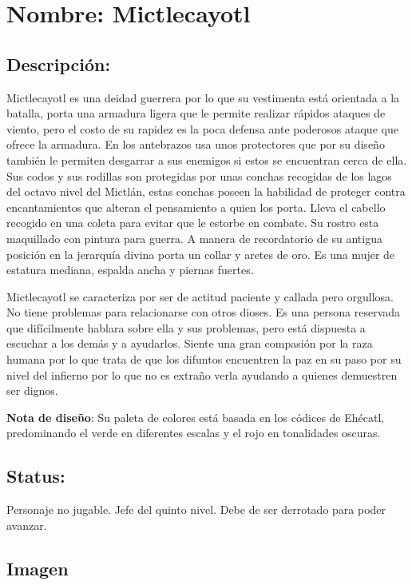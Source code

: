 \section{Nombre: Mictlecayotl}  \label{per:mictlecayotl}

\subsection{Descripción:}
Mictlecayotl es una deidad guerrera por lo que su vestimenta está orientada a la batalla, porta una armadura ligera que le permite realizar rápidos ataques de viento, pero el costo de su rapidez es la poca defensa ante poderosos ataque que ofrece la armadura. En los antebrazos usa unos protectores que por su diseño también le permiten desgarrar a sus enemigos si estos se encuentran cerca de ella. Sus codos y sus rodillas son protegidas por unas conchas recogidas de los lagos del octavo nivel del Mictlán, estas conchas poseen la habilidad de proteger contra encantamientos que alteran el pensamiento a quien los porta. Lleva el cabello recogido en una coleta para evitar que le estorbe en combate. Su rostro esta maquillado con pintura para guerra. A manera de recordatorio de su antigua posición en la jerarquía divina porta un collar y aretes de oro. Es una mujer de estatura mediana, espalda ancha y piernas fuertes. 
\\
\par
Mictlecayotl se caracteriza por ser de actitud paciente y callada pero orgullosa. No tiene problemas para relacionarse con otros dioses. Es una persona reservada que difícilmente hablara sobre ella y sus problemas, pero está dispuesta a escuchar a los demás y a ayudarlos. Siente una gran compasión por la raza humana por lo que trata de que los difuntos encuentren la paz en su paso por su nivel del infierno por lo que no es extraño verla ayudando a quienes demuestren ser dignos.  
\\
\par
\textbf{Nota de diseño}: Su paleta de colores está basada en los códices de Ehécatl, predominando el verde en diferentes escalas y el rojo en tonalidades oscuras. 	  
\subsection{Status:}
Personaje no jugable.
Jefe del quinto nivel. Debe de ser derrotado para poder avanzar.
\subsection{Imagen}
